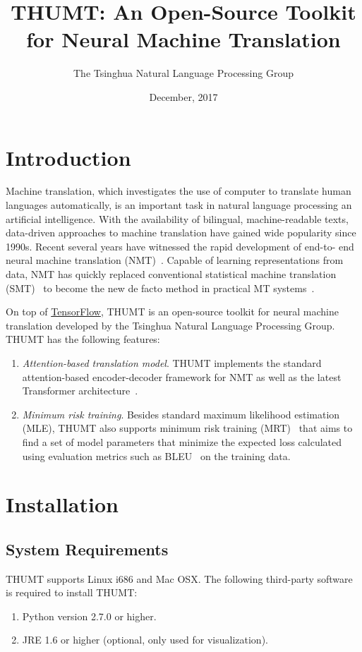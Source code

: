 \documentclass{article}
\title{THUMT: An Open-Source Toolkit for Neural Machine Translation}
\author{The Tsinghua Natural Language Processing Group}
\date{December, 2017}
\begin{document}
\maketitle

\section{Introduction}
Machine translation, which investigates the use of computer to translate human languages automatically, is an important task in natural language processing an artificial intelligence. With the availability of bilingual, machine-readable texts, data-driven approaches to machine translation have gained wide popularity since 1990s. Recent several years have witnessed the rapid development of end-to- end neural machine translation (NMT)~\citep{Sutskever:14,Bahdanau:15}. Capable of learning representations from data, NMT has quickly replaced conventional statistical machine translation (SMT)~\citep{Brown:93,Koehn:03,Chiang:05} to become the new de facto method in practical MT systems~\citep{Wu:16}.

On top of \href{http://tensorflow.org)}{TensorFlow}, THUMT is an open-source toolkit for neural machine translation developed by the Tsinghua Natural Language Processing Group. THUMT has the following features:
\begin{enumerate}
\item \emph{Attention-based translation model}. THUMT implements the standard attention-based encoder-decoder framework for NMT\citep{Bahdanau:15} as well as the latest Transformer architecture~\citep{vaswani2017attention}.
\item \emph{Minimum risk training}. Besides standard maximum likelihood estimation (MLE), THUMT also supports minimum risk training (MRT)~\citep{Shen:16} that aims to find a set of model parameters that minimize the expected loss calculated using evaluation metrics such as BLEU~\citep{Papineni:02} on the training data.
\end{enumerate}


\section{Installation}

\subsection{System Requirements}
THUMT supports Linux i686 and Mac OSX. The following third-party software is required to install THUMT:
\begin{enumerate}
\item Python version 2.7.0 or higher.
\item JRE 1.6 or higher (optional, only used for visualization).
\end{enumerate}
\end{document}
